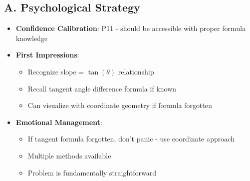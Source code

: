\documentclass[12pt]{article}
\begin{document}
\begin{strategicbox}
\subsection*{A. Psychological Strategy}
\begin{itemize}[leftmargin=*]
    \item \textbf{Confidence Calibration}: P11 - should be accessible with proper formula knowledge
    \item \textbf{First Impressions}: 
    \begin{itemize}
        \item Recognize slope = $\tan(\theta)$ relationship
        \item Recall tangent angle difference formula if known
        \item Can visualize with coordinate geometry if formula forgotten
    \end{itemize}
    \item \textbf{Emotional Management}: 
    \begin{itemize}
        \item If tangent formula forgotten, don't panic - use coordinate approach
        \item Multiple methods available
        \item Problem is fundamentally straightforward
    \end{itemize}
\end{itemize}


\end{strategicbox}
\end{document}

